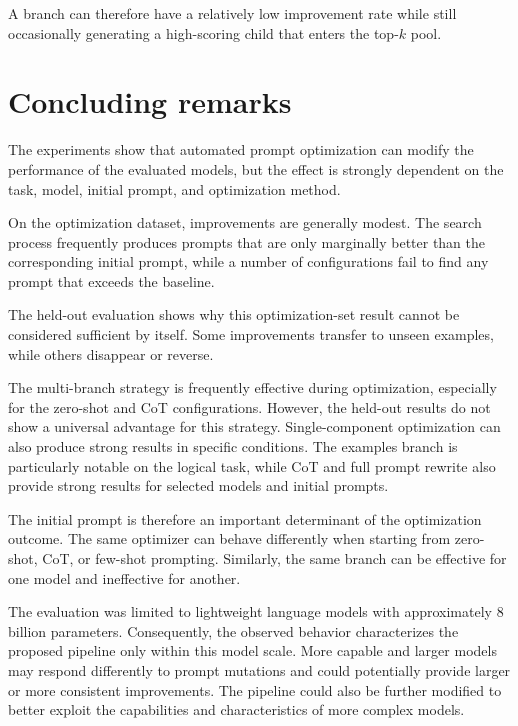 \documentclass[pdflatex,sn-mathphys-num]{sn-jnl}%
\theoremstyle{thmstyleone}%
\theoremstyle{thmstyletwo}%
\theoremstyle{thmstylethree}%
\begin{document}
A branch can therefore have a relatively low improvement rate while
still occasionally generating a high-scoring child that enters the
top-$k$ pool.

\section{Concluding remarks}

The experiments show that automated prompt optimization can modify the
performance of the evaluated models, but the effect is strongly
dependent on the task, model, initial prompt, and optimization method.

On the optimization dataset, improvements are generally modest. The
search process frequently produces prompts that are only marginally
better than the corresponding initial prompt, while a number of
configurations fail to find any prompt that exceeds the baseline.

The held-out evaluation shows why this optimization-set result cannot
be considered sufficient by itself. Some improvements transfer to
unseen examples, while others disappear or reverse.

The multi-branch strategy is frequently effective during optimization,
especially for the zero-shot and CoT configurations. However, the
held-out results do not show a universal advantage for this strategy.
Single-component optimization can also produce strong results in
specific conditions. The examples branch is particularly notable on
the logical task, while CoT and full prompt rewrite also provide strong 
results for selected models and initial prompts.

The initial prompt is therefore an important determinant of the
optimization outcome. The same optimizer can behave differently when
starting from zero-shot, CoT, or few-shot prompting. Similarly, the
same branch can be effective for one model and ineffective for
another.

The evaluation was limited to lightweight language models with
approximately 8 billion parameters. Consequently, the observed
behavior characterizes the proposed pipeline only within this model
scale. More capable and larger models may respond differently to prompt
mutations and could potentially provide larger or more consistent
improvements. The pipeline could also be further modified to better
exploit the capabilities and characteristics of more complex models.


\clearpage
\end{document}
